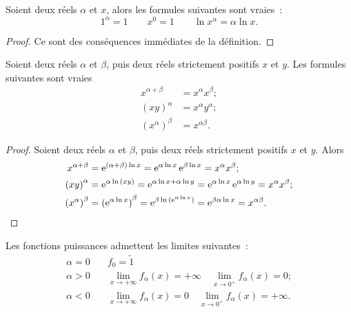 \begin{prop}
  Soient deux réels \(\alpha\) et \(x\), alors les formules suivantes sont 
  vraies~:
  \begin{equation}
    1^{\alpha} = 1 \qquad x^0 = 1 \qquad \ln x^{\alpha} = \alpha \ln x.
  \end{equation}
\end{prop}

\begin{proof}
  Ce sont des conséquences immédiates de la définition.
\end{proof}

\begin{prop}
  Soient deux réels \(\alpha\) et \(\beta\), puis deux réels strictement 
  positifs \(x\) et \(y\). Les formules suivantes sont vraies
  \begin{align*}
    x^{\alpha+\beta} &= x^\alpha x^\beta;\\
    {(xy)}^\alpha &= x^\alpha y^\alpha;\\
    {(x^\alpha)}^\beta &= x^{\alpha\beta}.
  \end{align*}
\end{prop}

\begin{proof}
  Soient deux réels \(\alpha\) et \(\beta\), puis deux réels strictement 
  positifs \(x\) et \(y\). Alors
  \begin{align*}
    x^{\alpha+\beta} & = \operatorname{e}^{(\alpha+\beta)\ln x} = \operatorname{e}^{\alpha \ln x} \operatorname{e}^{\beta 
    \ln x} = x^\alpha x^\beta;\\
      {(xy)}^\alpha & = \operatorname{e}^{\alpha \ln{(xy)}} = \operatorname{e}^{\alpha \ln x +\alpha \ln y} = 
      \operatorname{e}^{\alpha \ln x} \operatorname{e}^{\alpha \ln y} = x^\alpha x^\beta ;\\
      {(x^\alpha)}^\beta & = {(\operatorname{e}^{\alpha \ln x})}^\beta = \operatorname{e}^{\beta \ln{(\operatorname{e}^{\alpha 
      \ln x})}} = \operatorname{e}^{\beta \alpha \ln x} = x^{\alpha \beta}.
        \end{align*}
\end{proof}

Les fonctions puissances admettent les limites suivantes~:
\begin{align*}
  \alpha = 0 &\quad f_0 = \tilde{1} \\
  \alpha>0 &\quad \lim\limits_{x \to +\infty} f_\alpha(x) = +\infty \quad 
  \lim\limits_{x \to 0^{+}} f_\alpha(x) = 0;\\
  \alpha<0 &\quad \lim\limits_{x \to +\infty} f_\alpha(x) = 0 \quad 
  \lim\limits_{x \to 0^{+}} f_\alpha(x) = +\infty.
\end{align*}

